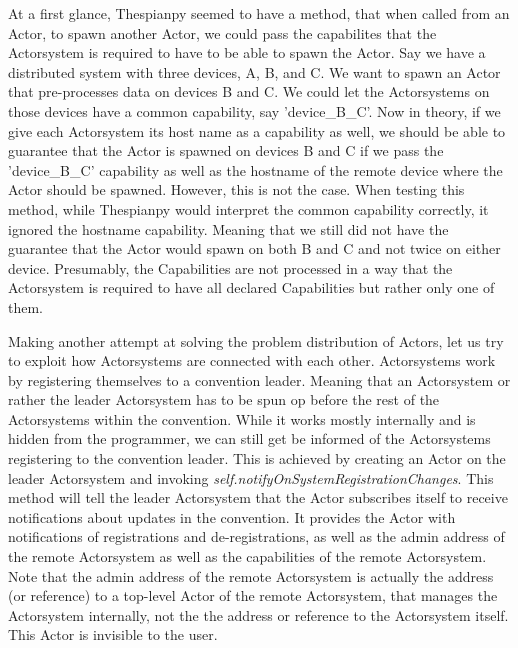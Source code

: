 \documentclass[a4paper]{article}
\begin{document}
At a first glance, Thespianpy seemed to have a method, that when called from an Actor, to spawn another Actor, we could pass the capabilites that the Actorsystem is required to have to be able to spawn the Actor. Say we have a distributed system with three devices, A, B, and C. We want to spawn an Actor that pre-processes data on devices B and C. We could let the Actorsystems on those devices have a common capability, say 'device\_B\_C'. Now in theory, if we give each Actorsystem its host name as a capability as well, we should be able to guarantee that the Actor is spawned on devices B and C if we pass the 'device\_B\_C' capability as well as the hostname of the remote device where the Actor should be spawned. However, this is not the case. When testing this method, while Thespianpy would interpret the common capability correctly, it ignored the hostname capability. Meaning that we still did not have the guarantee that the Actor would spawn on both B and C and not twice on either device. Presumably, the Capabilities are not processed in a way that the Actorsystem is required to have all declared Capabilities but rather only one of them.

Making another attempt at solving the problem distribution of Actors, let us try to exploit how Actorsystems are connected with each other. Actorsystems work by registering themselves to a convention leader. Meaning that an Actorsystem or rather the leader Actorsystem has to be spun op before the rest of the Actorsystems within the convention. While it works mostly internally and is hidden from the programmer, we can still get be informed of the Actorsystems registering to the convention leader. This is achieved by creating an Actor on the leader Actorsystem and invoking \textit{self.notifyOnSystemRegistrationChanges}. This method will tell the leader Actorsystem that the Actor subscribes itself to receive notifications about updates in the convention. It provides the Actor with notifications of registrations and de-registrations, as well as the admin address of the remote Actorsystem as well as the capabilities of the remote Actorsystem. Note that the admin address of the remote Actorsystem is actually the address (or reference) to a top-level Actor of the remote Actorsystem, that manages the Actorsystem internally, not the the address or reference to the Actorsystem itself. This Actor is invisible to the user.
\end{document}
